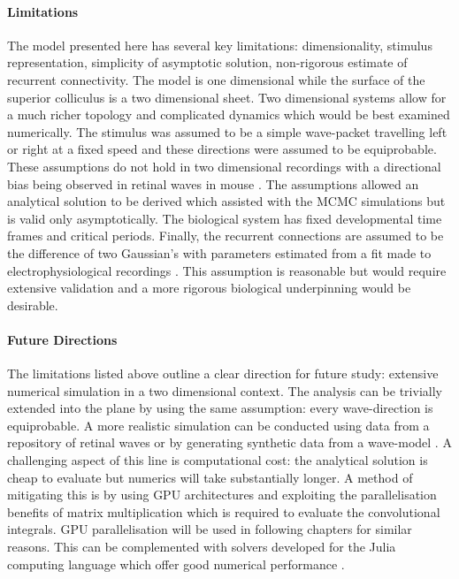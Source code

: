 \paragraph{Limitations}
The model presented here has several key limitations: dimensionality,  stimulus representation, simplicity of asymptotic solution, non-rigorous estimate of recurrent connectivity. The model is one dimensional while the surface of the superior colliculus is a two dimensional sheet. Two dimensional systems allow for a much richer topology and complicated dynamics which would be best examined numerically. The stimulus was assumed to be a simple wave-packet travelling left or right at a fixed speed and these directions were assumed to be equiprobable. These assumptions do not hold in two dimensional recordings with a directional bias being observed in retinal waves in mouse \cite{Ackman2012-uu}. The assumptions allowed an analytical solution to be derived which assisted with the MCMC simulations but is valid only asymptotically. The biological system has fixed developmental time frames and critical periods. Finally, the recurrent connections are assumed to be the difference of two Gaussian's with parameters estimated from a fit made to electrophysiological recordings \cite{Phongphanphanee2014-in}. This assumption is reasonable but would require extensive validation and a more rigorous biological underpinning would be desirable.
\paragraph{Future Directions}
The limitations listed above outline a clear direction for future study: extensive numerical simulation in a two dimensional context. The analysis can be trivially extended into the plane by using the same assumption: every wave-direction is equiprobable. A more realistic simulation can be conducted using data from a repository of retinal waves or by generating synthetic data from a wave-model \cite{Eglen2014-fo, Godfrey2009-rs}. A challenging aspect of this line is computational cost: the analytical solution is cheap to evaluate but numerics will take substantially longer. A method of mitigating this is by using GPU architectures and exploiting the parallelisation benefits of matrix multiplication which is required to evaluate the convolutional integrals. GPU parallelisation will be used in following chapters for similar reasons. This can be complemented with solvers developed for the Julia computing language which offer good numerical performance \cite{Sequeira2022}.

